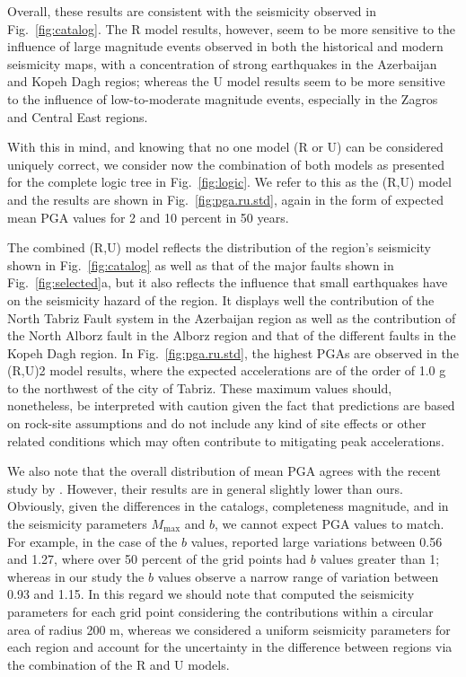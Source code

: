 Overall, these results are consistent with the seismicity observed in Fig.~\ref{fig:catalog}. The R model results, however, seem to be more sensitive to the influence of large magnitude events observed in both the historical and modern seismicity maps, with a concentration of strong earthquakes in the Azerbaijan and Kopeh Dagh regios; whereas the U model results seem to be more sensitive to the influence of low-to-moderate magnitude events, especially in the Zagros and Central East regions.

With this in mind, and knowing that no one model (R or U) can be considered uniquely correct, we consider now the combination of both models as presented for the complete logic tree in Fig.~\ref{fig:logic}. We refer to this as the (R,U) model and the results are shown in Fig.~\ref{fig:pga.ru.std}, again in the form of expected mean PGA values for 2 and 10 percent in 50 years.

The combined (R,U) model reflects the distribution of the region's seismicity shown in Fig.~\ref{fig:catalog} as well as that of the major faults shown in Fig.~\ref{fig:selected}a, but it also reflects the influence that small earthquakes have on the seismicity hazard of the region. It displays well the contribution of the North Tabriz Fault system in the Azerbaijan region as well as the contribution of the North Alborz fault in the Alborz region and that of the different faults in the Kopeh Dagh region. In Fig.~\ref{fig:pga.ru.std}, the highest PGAs are observed in the (R,U)2 model results, where the expected accelerations are of the order of 1.0 g to the northwest of the city of Tabriz. These maximum values should, nonetheless, be interpreted with caution given the fact that predictions are based on rock-site assumptions and do not include any kind of site effects or other related conditions which may often contribute to mitigating peak accelerations.

We also note that the overall distribution of mean PGA agrees with the recent study by \citet{Khodaverdian_2016_BSSA}. However, their results are in general slightly lower than ours. Obviously, given the differences in the catalogs, completeness magnitude, and in the seismicity parameters $M_{\max}$ and $b$, we cannot expect PGA values to match. For example, in the case of the $b$ values, \citet{Khodaverdian_2016_BSSA} reported large variations between 0.56 and 1.27, where over 50 percent of the grid points had $b$ values greater than 1; whereas in our study the $b$ values observe a narrow range of variation between 0.93 and 1.15. In this regard we should note that \citet{Khodaverdian_2016_BSSA} computed the seismicity parameters for each grid point considering the contributions within a circular area of radius 200 m, whereas we considered a uniform seismicity parameters for each region and account for the uncertainty in the difference between regions via the combination of the R and U models.

